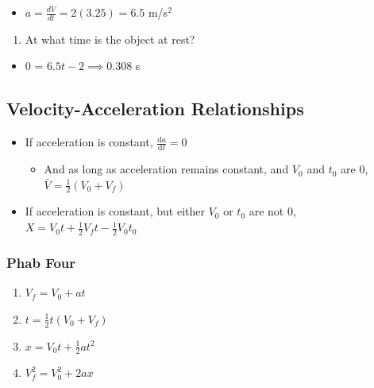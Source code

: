 \documentclass[
  letterpaper,
  DIV=11,
  numbers=noendperiod]{scrartcl}
\providecommand{\tightlist}{%
  \setlength{\itemsep}{0pt}\setlength{\parskip}{0pt}}\usepackage{longtable,booktabs,array}
\begin{document}
\begin{itemize}
\tightlist
\item
  \(a = \frac{dV}{dt} = 2(3.25) = 6.5\) m/s\(^2\)
\end{itemize}

\begin{enumerate}
\def\labelenumi{(\alph{enumi})}
\setcounter{enumi}{6}
\tightlist
\item
  At what time is the object at rest?
\end{enumerate}

\begin{itemize}
\tightlist
\item
  0 = \(6.5t-2 \implies 0.308\) s
\end{itemize}

\newpage{}

\hypertarget{velocity-acceleration-relationships}{%
\subsection{Velocity-Acceleration
Relationships}\label{velocity-acceleration-relationships}}

\begin{itemize}
\tightlist
\item
  If acceleration is constant, \(\frac{\mathrm{d}a}{\mathrm{d}t} = 0\)

  \begin{itemize}
  \tightlist
  \item
    And as long as acceleration remains constant, and \(V_0\) and
    \(t_0\) are 0, \(\bar{V} = \frac{1}{2}(V_0 + V_f)\)
  \end{itemize}
\item
  If acceleration is constant, but either \(V_0\) or \(t_0\) are not 0,
  \(X = V_0t + \frac{1}{2}V_ft-\frac{1}{2}V_0t_0\)
\end{itemize}

\hypertarget{phab-four}{%
\subsubsection{Phab Four}\label{phab-four}}

\begin{enumerate}
\def\labelenumi{\arabic{enumi}.}
\tightlist
\item
  \(V_f = V_0 + at\)
\item
  \(t = \frac{1}{2}t(V_0 + V_f)\)
\item
  \(x = V_0t + \frac{1}{2}at^2\)
\item
  \(V_f^2 = V_0^2 + 2ax\)
\end{enumerate}
\end{document}
